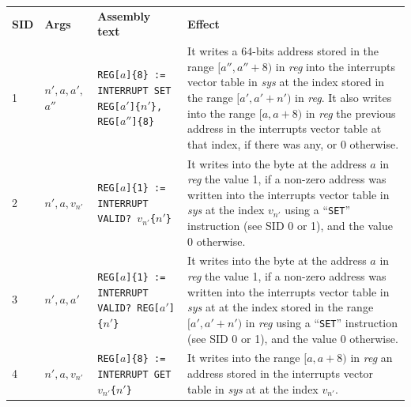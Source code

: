 \documentclass[10pt,twocolumn]{article}
\begin{document}
\begin{table}[!h]
\begin{center}
\def\arraystretch{1.5}
\begin{tabular}{lp{1.2cm}p{5.5cm}p{7.5cm}}
\textbf{SID} & \textbf{Args} & \textbf{Assembly text} & \textbf{Effect}
\\

1 & $ n',a,a',$  $a'' $ %
& \texttt{REG[}$ a $\texttt{]\{8\} := INTERRUPT SET REG[}$ a' $\texttt{]\{}$
n' $\texttt{\}, REG[}$ a'' $\texttt{]\{8\}} %
& It writes a $ 64 $-bits address stored in the range $ [a'',a''+8) $ in
\textit{reg} into the interrupts vector table in \textit{sys} at the index
stored in the range $ [a',a'+n') $ in \textit{reg}. It also writes into the
range $ [a,a+8) $ in \textit{reg} the previous address in the interrupts
vector table at that index, if there was any, or 0 otherwise. \\


2 & $ n',a,v_{n'} $ %
& \texttt{REG[}$ a $\texttt{]\{1\} := INTERRUPT VALID? }$ v_{n'} $\texttt{\{}$
n' $\texttt{\}} %
& It writes into the byte at the address $ a $ in \textit{reg} the value 1, if a
non-zero address was written into the interrupts vector table in \textit{sys} at
the index $ v_{n'} $ using a ``\texttt{SET}'' instruction (see SID 0 or 1), and
the value 0 otherwise. \\

3 & $ n',a,a' $ %
& \texttt{REG[}$ a $\texttt{]\{1\} := INTERRUPT VALID? REG[}$ a' $\texttt{]\{}$
n' $\texttt{\}} %
& It writes into the byte at the address $ a $ in \textit{reg} the value 1, if a
non-zero address was written into the interrupts vector table in \textit{sys} at
at the index stored in the range $ [a',a'+n') $ in \textit{reg} using a
``\texttt{SET}'' instruction (see SID 0 or 1), and the value 0 otherwise. \\

4 & $ n',a,v_{n'} $ %
& \texttt{REG[}$ a $\texttt{]\{8\} := INTERRUPT GET }$ v_{n'} $\texttt{\{}$
n' $\texttt{\}} %
& It writes into the range $ [a,a+8) $ in \textit{reg} an address stored in the
interrupts vector table in \textit{sys} at at the index $ v_{n'} $.


\end{tabular}
\end{center}
\end{table}
\end{document}
